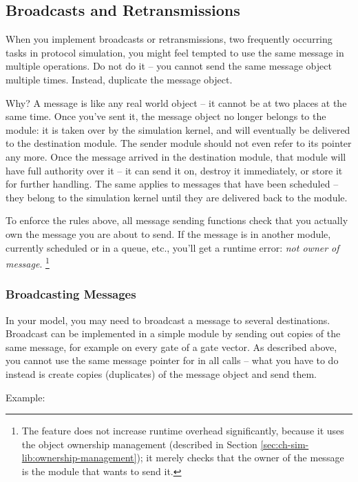 \subsection{Broadcasts and Retransmissions}

When you implement broadcasts or retransmissions, two frequently
occurring tasks in protocol simulation, you might feel tempted
to use the same message in multiple  operations.
Do not do it -- you cannot send the same message object multiple times.
Instead, duplicate the message object.

Why? A message is like any real world object -- it cannot be at two places
at the same time. Once you've sent it, the message object no longer belongs
to the module: it is taken over by the simulation kernel, and will
eventually be delivered to the destination module. The sender module should
not even refer to its pointer any more. Once the message arrived in the
destination module, that module will have full authority over it -- it can
send it on, destroy it immediately, or store it for further handling. The
same applies to messages that have been scheduled -- they belong to the
simulation kernel until they are delivered back to the module.

To enforce the rules above, all message sending functions check that you
actually own the message you are about to send. If the message is in
another module, currently scheduled or in a queue, etc., you'll get a
runtime error: \textit{not owner of message}.
  \footnote{The feature does not increase runtime overhead significantly, because
  it uses the object ownership management (described in
  Section \ref{sec:ch-sim-lib:ownership-management});
  it merely checks that the owner of the message is the module that
  wants to send it.}


\subsubsection{Broadcasting Messages}

In your model, you may need to broadcast a message to several destinations.
Broadcast can be implemented in a simple module by sending out copies
of the same message, for example on every gate of a gate vector.
As described above, you cannot use the same message pointer for
in all  calls -- what you have to do instead is
create copies (duplicates) of the message object and send them.

Example:

